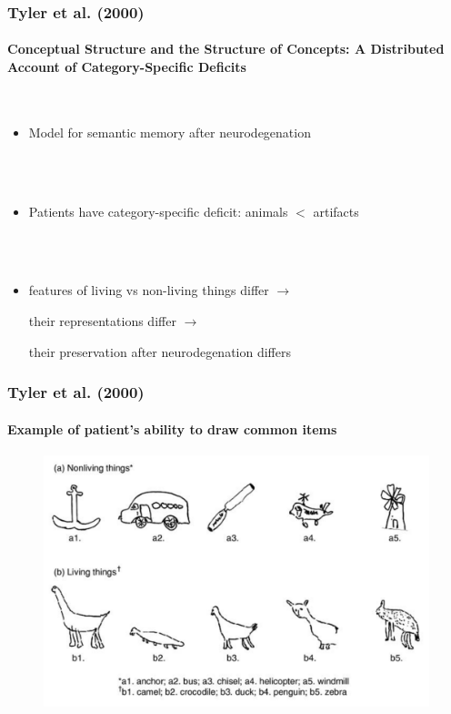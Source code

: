 \documentclass{beamer}
\begin{document}
\begin{frame}[fragile]
\frametitle{Tyler et al. (2000)}
\framesubtitle{Conceptual Structure and the Structure of Concepts: A
Distributed Account of Category-Specific Deficits}
             \  \\

\begin{itemize}
\item<2-> Model for semantic memory after neurodegenation 

\ \\

\ \\

 \item <3-> Patients have category-specific deficit: animals $<$ artifacts

 \ \\
 
 \ \\
 
\item<4->features of living vs non-living things differ $\rightarrow$

their representations differ $\rightarrow$

their preservation after neurodegenation differs
\end{itemize}
\end{frame}

\begin{frame}[fragile]
\frametitle{Tyler et al. (2000)}
\framesubtitle{Example of patient's ability to draw common items}

\begin{figure}[t]
 \begin{flushleft}
\centering
 \includegraphics[scale=.26]{./fig/taylor_2000.png}


 \end{flushleft}

 \end{figure}
\end{frame}
\end{document}
